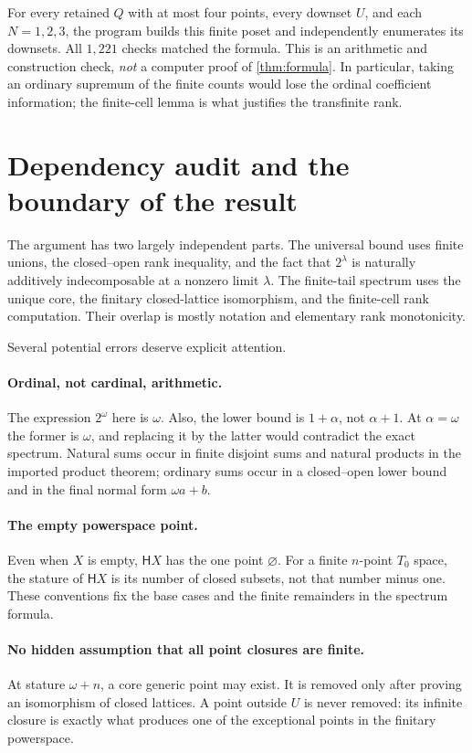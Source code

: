 \documentclass[11pt,a4paper]{article}
\theoremstyle{definition}
\newcommand{\HH}{\mathsf H}
\numberwithin{equation}{section}
\begin{document}
For every retained $Q$ with at most four points, every downset $U$, and
each $N=1,2,3$, the program builds this finite poset and independently
enumerates its downsets.  All $1{,}221$ checks matched the formula.
This is an arithmetic and construction check, \emph{not} a computer
proof of \cref{thm:formula}.  In particular, taking an ordinary supremum
of the finite counts would lose the ordinal coefficient information;
the finite-cell lemma is what justifies the transfinite rank.

\section{Dependency audit and the boundary of the result}
\label{sec:audit}

The argument has two largely independent parts.  The universal bound
uses finite unions, the closed--open rank inequality, and the fact that
$2^\lambda$ is naturally additively indecomposable at a nonzero limit
$\lambda$.  The finite-tail spectrum uses the unique core, the finitary
closed-lattice isomorphism, and the finite-cell rank computation.
Their overlap is mostly notation and elementary rank monotonicity.

Several potential errors deserve explicit attention.

\paragraph{Ordinal, not cardinal, arithmetic.}
The expression $2^\omega$ here is $\omega$.  Also, the lower bound is
$1+\alpha$, not $\alpha+1$.  At $\alpha=\omega$ the former is $\omega$,
and replacing it by the latter would contradict the exact spectrum.
Natural sums occur in finite disjoint sums and natural products in the
imported product theorem; ordinary sums occur in a closed--open lower
bound and in the final normal form $\omega a+b$.

\paragraph{The empty powerspace point.}
Even when $X$ is empty, $\HH X$ has the one point $\varnothing$.
For a finite $n$-point $T_0$ space, the stature of $\HH X$ is its number
of closed subsets, not that number minus one.  These conventions fix
the base cases and the finite remainders in the spectrum formula.

\paragraph{No hidden assumption that all point closures are finite.}
At stature $\omega+n$, a core generic point may exist.  It is removed
only after proving an isomorphism of closed lattices.  A point outside
$U$ is never removed: its infinite closure is exactly what produces
one of the exceptional points in the finitary powerspace.
\end{document}
